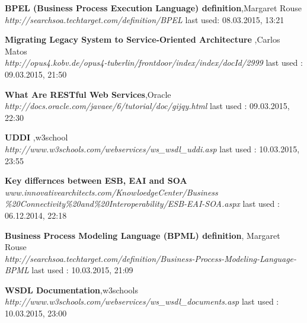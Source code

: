 \documentclass[12pt]{article}
\begin{document}
\begin{thebibliography}{56}
     
  
     
    


     


   \textbf{BPEL (Business Process Execution Language) definition},Margaret Rouse \\
  \textit{http://searchsoa.techtarget.com/definition/BPEL}
  \newline last used: 08.03.2015, 13:21

    \textbf{Migrating Legacy System to Service-Oriented Architecture },Carlos Matos\\
    \textit{http://opus4.kobv.de/opus4-tuberlin/frontdoor/index/index/docId/2999}
    \newline last used : 09.03.2015, 21:50

    \textbf{What Are RESTful Web Services},Oracle \\
    \textit{http://docs.oracle.com/javaee/6/tutorial/doc/gijqy.html}
    \newline last used : 09.03.2015, 22:30

    \textbf{UDDI },w3school\\
    \textit{http://www.w3schools.com/webservices/ws\_wsdl\_uddi.asp}
    \newline last used : 10.03.2015, 23:55

  


   \textbf{Key differnces between ESB, EAI and SOA}\\
  \textit{www.innovativearchitects.com/KnowloedgeCenter/Business \\ \%20Connectivity\%20and\%20Interoperability/ESB-EAI-SOA.aspx}
  \newline last used : 06.12.2014, 22:18



 	
   	  
   \textbf{Business Process Modeling Language (BPML) definition}, Margaret Rouse\\
  \textit{http://searchsoa.techtarget.com/definition/Business-Process-Modeling-Language-BPML}
  \newline last used : 10.03.2015, 21:09

   	\textbf{WSDL Documentation},w3schools \\
    \textit{http://www.w3schools.com/webservices/ws\_wsdl\_documents.asp}
    \newline last used : 10.03.2015, 23:00


\end{thebibliography}
\end{document}
